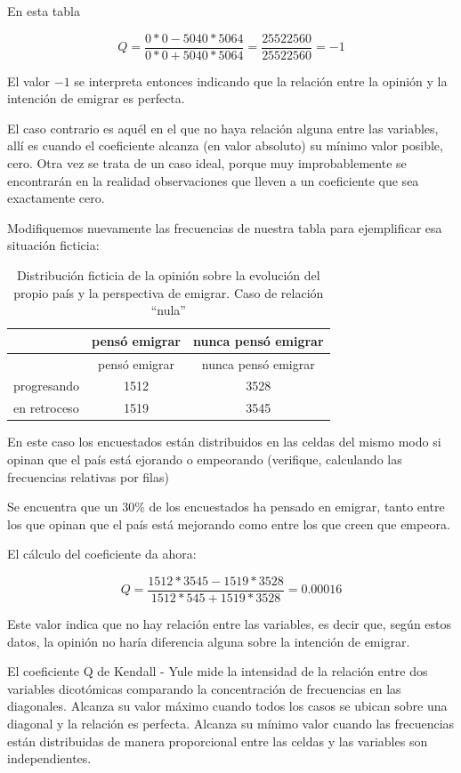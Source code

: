 \documentclass[]{book}
\begin{document}
En esta tabla

\[Q = \frac{0*0 - 5040*5064}{0*0+5040*5064} = \frac{25522560}{25522560} = -1\]

El valor \(-1\) se interpreta entonces indicando que la relación entre la opinión y la intención de emigrar es perfecta.

El caso contrario es aquél en el que no haya relación alguna entre las
variables, allí es cuando el coeficiente alcanza (en valor absoluto) su mínimo valor posible, cero. Otra vez se trata de un caso ideal, porque muy improbablemente se encontrarán en la realidad observaciones que lleven a un coeficiente que sea exactamente cero.

Modifiquemos nuevamente las frecuencias de nuestra tabla para
ejemplificar esa situación ficticia:

\begin{longtable}[]{@{}lcc@{}}
\caption{\label{tab:unnamed-chunk-119}Distribución ficticia de la opinión sobre la evolución del propio país y la perspectiva de emigrar. Caso de relación ``nula''}\tabularnewline
\toprule
& pensó emigrar & nunca pensó emigrar\tabularnewline
\midrule
\endfirsthead
\toprule
& pensó emigrar & nunca pensó emigrar\tabularnewline
\midrule
\endhead
progresando & 1512 & 3528\tabularnewline
en retroceso & 1519 & 3545\tabularnewline
\bottomrule
\end{longtable}

En este caso los encuestados están distribuidos en las celdas del mismo modo si opinan que el país está ejorando o empeorando (verifique, calculando las frecuencias relativas por filas)

Se encuentra que un 30\% de los encuestados ha pensado en emigrar, tanto entre los que opinan que el país está mejorando como entre los que creen que empeora.

El cálculo del coeficiente da ahora:

\[Q = \frac{1512*3545-1519*3528}{1512*545+1519*3528} = 0.00016\]

Este valor indica que no hay relación entre las variables, es decir que, según estos datos, la opinión no haría diferencia alguna sobre la intención de emigrar.

El coeficiente Q de Kendall - Yule mide la intensidad de la relación
entre dos variables dicotómicas comparando la concentración de
frecuencias en las diagonales. Alcanza su valor máximo cuando todos los casos se ubican sobre una diagonal y la relación es perfecta. Alcanza su mínimo valor cuando las frecuencias están distribuidas de manera proporcional entre las celdas y las variables son independientes.
\end{document}
